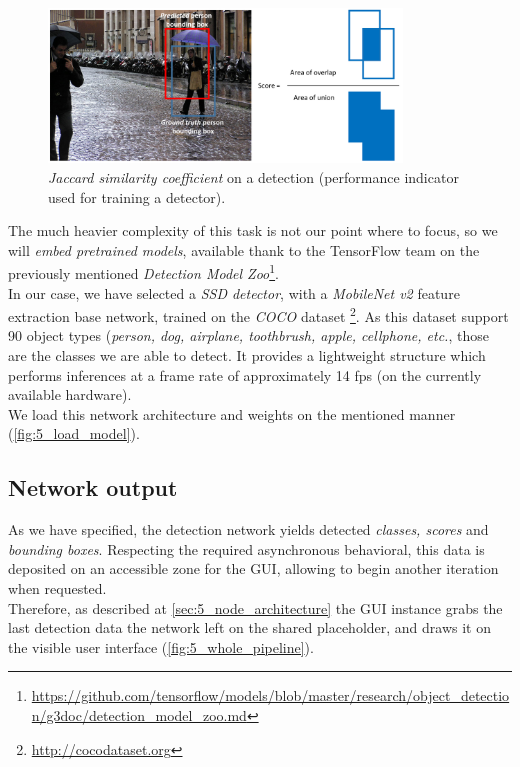 		\begin{figure}[h!]
			\centering
			\includegraphics[width=3.7in]{images/detection_iou}
			\caption{\emph{Jaccard similarity coefficient} on a detection (performance indicator used for training a detector).}
			\label{fig:5_iou}
		\end{figure}
	
		The much heavier complexity of this task is not our point where to focus, so we will \emph{embed pretrained models}, available thank to the TensorFlow team on the previously mentioned \emph{Detection Model Zoo}\footnote{\url{https://github.com/tensorflow/models/blob/master/research/object_detection/g3doc/detection_model_zoo.md}}.\\
		
		In our case, we have selected a \emph{SSD detector}, with a \emph{MobileNet v2} feature extraction base network, trained on the \emph{COCO} dataset \footnote{\url{http://cocodataset.org}}. As this dataset support 90 object types (\emph{person, dog, airplane, toothbrush, apple, cellphone, etc.}, those are the classes we are able to detect. It provides a lightweight structure which performs inferences at a frame rate of approximately 14 fps (on the currently available hardware).\\
		
		We load this network architecture and weights on the mentioned manner (\autoref{fig:5_load_model}). 
	
	
	\subsection{Network output}
		As we have specified, the detection network yields detected \emph{classes, scores} and \emph{bounding boxes}. Respecting the required asynchronous behavioral, this data is deposited on an accessible zone for the GUI, allowing to begin another iteration when requested.\\
		
		Therefore, as described at \autoref{sec:5_node_architecture} the GUI instance grabs the last detection data the network left on the shared placeholder, and draws it on the visible user interface (\autoref{fig:5_whole_pipeline}).
		
